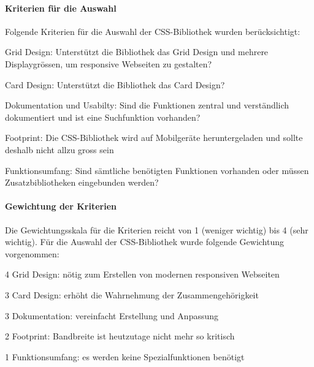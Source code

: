 \paragraph*{Kriterien für die Auswahl}
Folgende Kriterien für die Auswahl der CSS-Bibliothek wurden berücksichtigt:
\begin{itemize*}
\item Grid Design: Unterstützt die Bibliothek das Grid Design und mehrere Displaygrössen, um responsive Webseiten zu gestalten?
\item Card Design: Unterstützt die Bibliothek das Card Design?
\item Dokumentation und Usabilty: Sind die Funktionen zentral und verständlich dokumentiert und ist eine Suchfunktion vorhanden?
\item Footprint: Die CSS-Bibliothek wird auf Mobilgeräte heruntergeladen und sollte deshalb nicht allzu gross sein
\item Funktionsumfang: Sind sämtliche benötigten Funktionen vorhanden oder müssen Zusatzbibliotheken eingebunden werden?
\end{itemize*}


\paragraph*{Gewichtung der Kriterien}
Die Gewichtungsskala für die Kriterien reicht von 1 (weniger wichtig) bis 4 (sehr wichtig). Für die Auswahl der CSS-Bibliothek wurde folgende Gewichtung vorgenommen:
\begin{itemize*}
\item 4 Grid Design: nötig zum Erstellen von modernen responsiven Webseiten
\item 3 Card Design: erhöht die Wahrnehmung der Zusammengehörigkeit
\item 3 Dokumentation: vereinfacht Erstellung und Anpassung
\item 2 Footprint: Bandbreite ist heutzutage nicht mehr so kritisch
\item 1 Funktionsumfang: es werden keine Spezialfunktionen benötigt
\end{itemize*}



